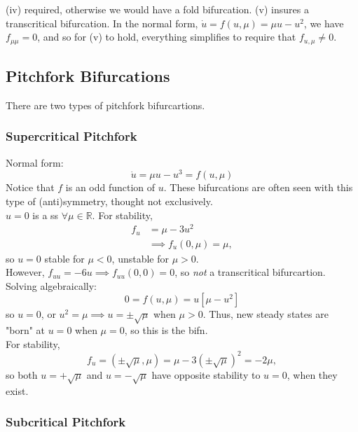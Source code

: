\documentclass[12pt, oneside]{article}
\begin{document}
\begin{remark}
  (iv) required, otherwise we would have a fold bifurcation. (v) insures a transcritical bifurcation. In the normal form, $\dot{u} = f(u, \mu) = \mu u - u^2$, we have $f_{\mu \mu} = 0$, and so for (v) to hold, everything simplifies to require that $f_{u, \mu} \neq 0$.
\end{remark}


\subsection{Pitchfork Bifurcations}

There are two types of pitchfork bifurcartions.

\subsubsection{Supercritical Pitchfork}
Normal form:
$$\dot{u} = \mu u - u^3 = f(u, \mu)$$
Notice that $f$ is an odd function of $u$. These bifurcations are often seen with this type of (anti)symmetry, thought not exclusively.\\
$u = 0$ is a ss $\forall \mu \in \mathbb{R}$. For stability,
\begin{align*}
  f_u &= \mu - 3u^2\\
  &\implies f_u(0, \mu) = \mu,
\end{align*}
so $u=0$ stable for $\mu < 0$, unstable for $\mu > 0$.\\
However, $f_{uu} = - 6u \implies f_{uu}(0,0) = 0$, so \textit{not} a transcritical bifurcartion.\\
Solving algebraically:
\[0 = f(u, \mu) = u[\mu - u^2]\] so $u = 0$, or $u^2 = \mu \implies u = \pm \sqrt{\mu}$ when $\mu > 0$. Thus, new steady states are "born" at $u = 0$ when $\mu =0$, so this is the bifn. \\For stability,
\[f_u = (\pm \sqrt{\mu}, \mu) = \mu - 3(\pm \sqrt{\mu})^2 = -2 \mu,\] so both $u = +\sqrt{\mu}$ and $u = - \sqrt{\mu}$ have opposite stability to $u = 0$, when they exist.\\

\subsubsection{Subcritical Pitchfork}
\end{document}
